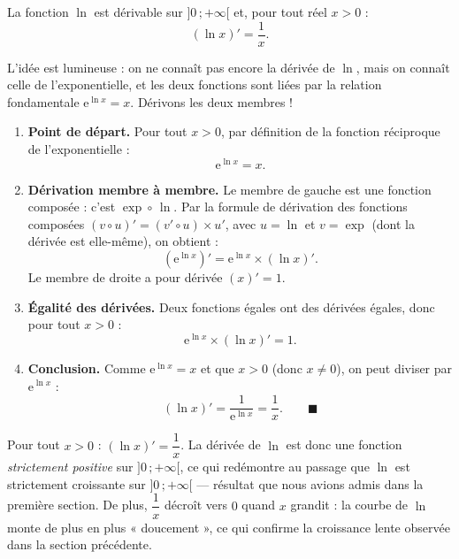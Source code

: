 \documentclass[11pt]{article}
\newcommand{\cle}[1]{{\popxbold\color{popdark}#1}}
\begin{document}
\begin{propriete}
La fonction $\ln$ est dérivable sur $]0\,;+\infty[$ et, pour tout réel $x > 0$ :
\[
(\ln x)' = \frac{1}{x}.
\]
\end{propriete}

\begin{experience}[Démonstration du théorème $(\ln x)' = \dfrac{1}{x}$]
L'idée est lumineuse : on ne connaît pas encore la dérivée de $\ln$, mais on connaît celle de l'exponentielle, et les deux fonctions sont liées par la relation fondamentale $\mathrm{e}^{\ln x} = x$. Dérivons les deux membres !
\begin{enumerate}
\item \textbf{Point de départ.} Pour tout $x > 0$, par définition de la fonction réciproque de l'exponentielle :
\[
\mathrm{e}^{\ln x} = x.
\]
\item \textbf{Dérivation membre à membre.} Le membre de gauche est une fonction composée : c'est $\exp \circ\, \ln$. Par la formule de dérivation des fonctions composées $(v \circ u)' = (v' \circ u) \times u'$, avec $u = \ln$ et $v = \exp$ (dont la dérivée est elle-même), on obtient :
\[
\left(\mathrm{e}^{\ln x}\right)' = \mathrm{e}^{\ln x} \times (\ln x)'.
\]
Le membre de droite a pour dérivée $(x)' = 1$.
\item \textbf{Égalité des dérivées.} Deux fonctions égales ont des dérivées égales, donc pour tout $x > 0$ :
\[
\mathrm{e}^{\ln x} \times (\ln x)' = 1.
\]
\item \textbf{Conclusion.} Comme $\mathrm{e}^{\ln x} = x$ et que $x > 0$ (donc $x \neq 0$), on peut diviser par $\mathrm{e}^{\ln x}$ :
\[
(\ln x)' = \frac{1}{\mathrm{e}^{\ln x}} = \frac{1}{x}. \qquad \blacksquare
\]
\end{enumerate}
\end{experience}

\begin{aretenir}
Pour tout $x > 0$ : $(\ln x)' = \dfrac{1}{x}$. La dérivée de $\ln$ est donc une fonction \emph{strictement positive} sur $]0\,;+\infty[$, ce qui redémontre au passage que $\ln$ est \cle{strictement croissante} sur $]0\,;+\infty[$ — résultat que nous avions admis dans la première section. De plus, $\dfrac{1}{x}$ décroît vers $0$ quand $x$ grandit : la courbe de $\ln$ monte de plus en plus « doucement », ce qui confirme la croissance lente observée dans la section précédente.
\end{aretenir}
\end{document}
